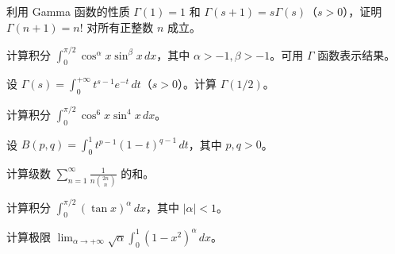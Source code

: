 \newpage
\noindent\begin{minipage}{\textwidth}
利用 Gamma 函数的性质 $\Gamma(1)=1$ 和 $\Gamma(s+1)=s\Gamma(s)$（$s>0$），证明 $\Gamma(n+1)=n!$ 对所有正整数 $n$ 成立。
\end{minipage}\par\vfill
\noindent\begin{minipage}{\textwidth}
计算积分 $\displaystyle\int_0^{\pi/2}\cos^\alpha x\sin^\beta x\,dx$，其中 $\alpha>-1,\beta>-1$。可用 $\Gamma$ 函数表示结果。
\end{minipage}\par\vfill
\noindent\begin{minipage}{\textwidth}
设 $\displaystyle\Gamma(s)=\int_0^{+\infty}t^{s-1}e^{-t}\,dt$（$s>0$）。计算 $\Gamma(1/2)$。
\end{minipage}\par\vfill
\newpage
\noindent\begin{minipage}{\textwidth}
计算积分 $\displaystyle\int_0^{\pi/2}\cos^6x\sin^4x\,dx$。
\end{minipage}\par\vfill
\noindent\begin{minipage}{\textwidth}
设 $B(p,q)=\int_0^1t^{p-1}(1-t)^{q-1}\,dt$，其中 $p,q>0$。
\end{minipage}\par\vfill
\noindent\begin{minipage}{\textwidth}
计算级数 $\displaystyle\sum_{n=1}^{\infty}\frac1{n\binom{2n}{n}}$ 的和。
\end{minipage}\par\vfill
\newpage
\noindent\begin{minipage}{\textwidth}
计算积分 $\displaystyle\int_0^{\pi/2}(\tan x)^\alpha\,dx$，其中 $|\alpha|<1$。
\end{minipage}\par\vfill
\noindent\begin{minipage}{\textwidth}
计算极限 $\displaystyle\lim_{\alpha\to+\infty}\sqrt\alpha\int_0^1(1-x^2)^\alpha\,dx$。
\end{minipage}\par\vfill
